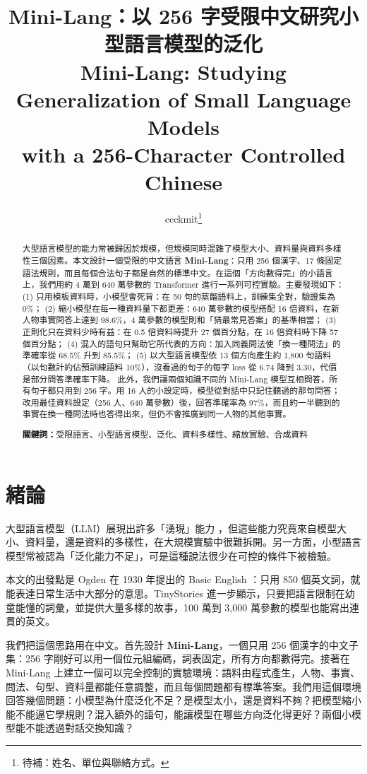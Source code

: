 \documentclass[11pt,a4paper]{article}
\title{\textbf{Mini-Lang：以 256 字受限中文研究小型語言模型的泛化}\\[0.6em]
\large Mini-Lang: Studying Generalization of Small Language Models\\ with a 256-Character Controlled Chinese}
\author{ccckmit\thanks{待補：姓名、單位與聯絡方式。}}
\date{}
\begin{document}
\maketitle

\begin{abstract}
大型語言模型的能力常被歸因於規模，但規模同時混雜了模型大小、資料量與資料多樣性三個因素。本文設計一個受限的中文語言 \textbf{Mini-Lang}：只用 256 個漢字、17 條固定語法規則，而且每個合法句子都是自然的標準中文。在這個「方向數得完」的小語言上，我們用約 4 萬到 640 萬參數的 Transformer 進行一系列可控實驗。主要發現如下：
(1) 只用模板資料時，小模型會死背：在 50 句的蒸餾語料上，訓練集全對，驗證集為 0\%；
(2) 縮小模型在每一種資料量下都更差：640 萬參數的模型搭配 16 倍資料，在新人物事實問答上達到 98.6\%，4 萬參數的模型則和「猜最常見答案」的基準相當；
(3) 正則化只在資料少時有益：在 0.5 倍資料時提升 27 個百分點，在 16 倍資料時下降 57 個百分點；
(4) 混入的語句只幫助它所代表的方向：加入同義問法使「換一種問法」的準確率從 68.5\% 升到 85.5\%；
(5) 以大型語言模型依 13 個方向產生約 1,800 句語料（以句數計約佔預訓練語料 10\%），沒看過的句子的每字 loss 從 6.74 降到 3.30，代價是部分問答準確率下降。
此外，我們讓兩個知識不同的 Mini-Lang 模型互相問答，所有句子都只用到 256 字。用 16 人的小設定時，模型從對話中只記住聽過的那句問答；改用最佳資料設定（256 人、640 萬參數）後，回答準確率為 97\%，而且約一半聽到的事實在換一種問法時也答得出來，但仍不會推廣到同一人物的其他事實。

\medskip
\noindent\textbf{關鍵詞：}受限語言、小型語言模型、泛化、資料多樣性、縮放實驗、合成資料
\end{abstract}

\section{緒論}

大型語言模型（LLM）展現出許多「湧現」能力 \cite{wei2022emergent}，但這些能力究竟來自模型大小、資料量，還是資料的多樣性，在大規模實驗中很難拆開。另一方面，小型語言模型常被認為「泛化能力不足」，可是這種說法很少在可控的條件下被檢驗。

本文的出發點是 Ogden 在 1930 年提出的 Basic English \cite{ogden1930basic}：只用 850 個英文詞，就能表達日常生活中大部分的意思。TinyStories \cite{eldan2023tinystories} 進一步顯示，只要把語言限制在幼童能懂的詞彙，並提供大量多樣的故事，100 萬到 3,000 萬參數的模型也能寫出連貫的英文。

我們把這個思路用在中文。首先設計 \textbf{Mini-Lang}，一個只用 256 個漢字的中文子集：256 字剛好可以用一個位元組編碼，詞表固定，所有方向都數得完。接著在 Mini-Lang 上建立一個可以完全控制的實驗環境：語料由程式產生，人物、事實、問法、句型、資料量都能任意調整，而且每個問題都有標準答案。我們用這個環境回答幾個問題：小模型為什麼泛化不足？是模型太小，還是資料不夠？把模型縮小能不能逼它學規則？混入額外的語句，能讓模型在哪些方向泛化得更好？兩個小模型能不能透過對話交換知識？
\end{document}
